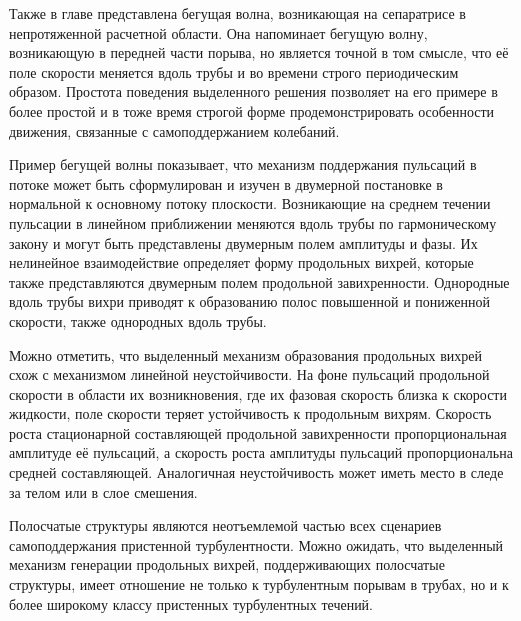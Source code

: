 Также в главе представлена бегущая волна, возникающая на сепаратрисе в непротяженной расчетной области. Она напоминает бегущую волну, возникающую в передней части порыва, но является точной в том смысле, что её поле скорости меняется вдоль трубы и во времени строго периодическим образом. Простота поведения выделенного решения позволяет на его примере в более простой и в тоже время строгой форме продемонстрировать особенности движения, связанные с самоподдержанием колебаний.

Пример бегущей волны показывает, что механизм поддержания пульсаций в потоке может быть сформулирован и изучен в двумерной постановке в нормальной к основному потоку плоскости. Возникающие на среднем течении пульсации в линейном приближении меняются вдоль трубы по гармоническому закону и могут быть представлены двумерным полем амплитуды и фазы. Их нелинейное взаимодействие определяет форму продольных вихрей, которые также представляются двумерным полем продольной завихренности. Однородные вдоль трубы вихри приводят к образованию полос повышенной и пониженной скорости, также однородных вдоль трубы. 

Можно отметить, что выделенный механизм образования продольных вихрей схож с механизмом линейной неустойчивости. На фоне пульсаций продольной скорости в области их возникновения, где их фазовая скорость близка к скорости жидкости, поле скорости теряет устойчивость к продольным вихрям. Скорость роста стационарной составляющей продольной завихренности пропорциональная амплитуде её пульсаций, а скорость роста амплитуды пульсаций пропорциональна средней составляющей. Аналогичная неустойчивость может иметь место в следе за телом или в слое смешения. 

Полосчатые структуры являются неотъемлемой частью всех сценариев самоподдержания пристенной турбулентности. Можно ожидать, что выделенный механизм генерации продольных вихрей, поддерживающих полосчатые структуры, имеет отношение не только к турбулентным порывам в трубах, но и к более широкому классу пристенных турбулентных течений. 





